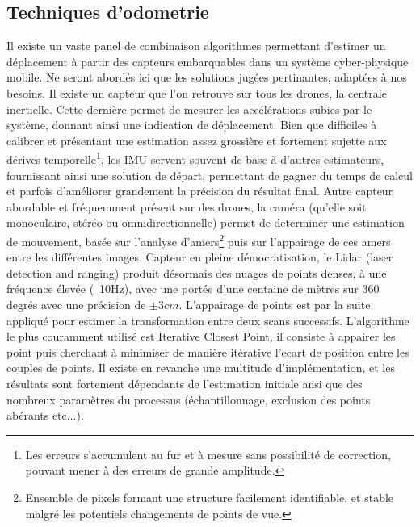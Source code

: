 \documentclass[twoside,twocolumn]{article}
\begin{document}
\subsection{Techniques d'odometrie}
Il existe un vaste panel de combinaison algorithmes permettant d'estimer un déplacement à partir des capteurs embarquables dans un système cyber-physique mobile.
Ne seront abordés ici que les solutions jugées pertinantes, adaptées à nos besoins.
Il existe un capteur que l'on retrouve sur tous les drones, la centrale inertielle. Cette dernière permet de mesurer les accélérations subies par le système,
donnant ainsi une indication de déplacement. Bien que difficiles à calibrer et présentant une estimation assez grossière et fortement sujette aux
dérives temporelle\footnote{Les erreurs s'accumulent au fur et à mesure sans possibilité de correction, pouvant mener à des erreurs de grande amplitude.},
les IMU servent souvent de base à d'autres estimateurs,
fournissant ainsi une solution de départ, permettant de gagner du temps de calcul et parfois d'améliorer grandement la précision du résultat final.
Autre capteur abordable et fréquemment présent sur des drones, la caméra (qu'elle soit monoculaire, stéréo ou omnidirectionnelle) permet de determiner une
estimation de mouvement, basée sur l'analyse d'amers\footnote{Ensemble de pixels formant une structure facilement identifiable,
 et stable malgré les potentiels changements de points de vue.}\cite{lindeberg_feature_1998} puis sur l'appairage de ces amers\cite{baumberg_reliable_2000}
entre les différentes images.
Capteur en pleine démocratisation, le Lidar (laser detection and ranging) produit désormais des nuages de points denses, à une fréquence élevée (~10Hz),
avec une portée d'une centaine de mètres sur 360 degrés avec une précision de $\pm 3cm$. L'appairage de points est par la suite appliqué pour estimer
la transformation entre deux scans successifs. L'algorithme le plus couramment utilisé est Iterative Closest Point, il consiste à appairer les point puis cherchant
à minimiser de manière itérative l'ecart de position entre les couples de points. Il existe en revanche une multitude d'implémentation, et les résultats sont fortement
dépendants de l'estimation initiale ansi que des nombreux paramètres du processus (échantillonnage, exclusion des points abérants etc...)\cite{pomerleau_review_2015}.
\end{document}
